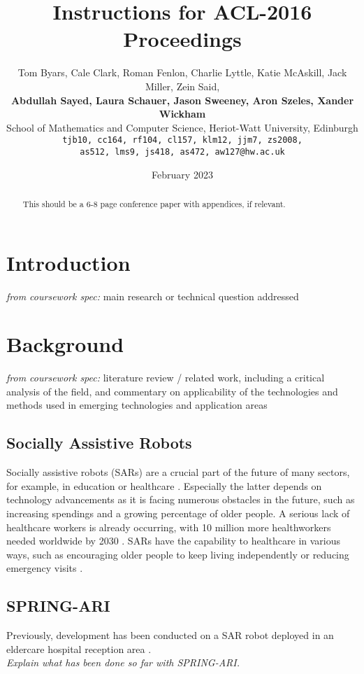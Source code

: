 \documentclass[11pt]{article}
\title{Instructions for ACL-2016 Proceedings}
\author{Tom Byars, Cale Clark, Roman Fenlon, Charlie Lyttle, Katie McAskill, Jack Miller, Zein Said, \\
{\bf Abdullah Sayed, Laura Schauer, Jason Sweeney, Aron Szeles, Xander Wickham} \\
School of Mathematics and Computer Science, Heriot-Watt University, Edinburgh \\ {\tt {tjb10, cc164, rf104, cl157, klm12, jjm7, zs2008,}} \\ {\tt {as512, lms9, js418, as472, aw127}@hw.ac.uk}}
\date{February 2023}
\begin{document}
\maketitle
\begin{abstract}
  This should be a 6-8 page conference paper with appendices, if relevant. 
\end{abstract}


\section{Introduction}
\label{sec:introduction}

\textit{from coursework spec:} main research or technical question addressed


\section{Background}
\label{sec:background}

\textit{from coursework spec:} literature review / related work, including a critical analysis of the field, and commentary on applicability of the technologies and methods used in emerging technologies and application areas

\subsection{Socially Assistive Robots} %
\label{subsec:socially_assistive_robots}
Socially assistive robots (SARs) are a crucial part of the future of many sectors, for example, in education or healthcare \cite{gunson_visually_aware_2022}. Especially the latter depends on technology advancements as it is facing numerous obstacles in the future, such as increasing spendings and a growing percentage of older people. A serious lack of healthcare workers is already occurring, with 10 million more healthworkers needed worldwide by 2030 \cite{cooper_ari_2020,Health_workforce_2023}. SARs have the capability to healthcare in various ways, such as encouraging older people to keep living independently or reducing emergency visits \cite{cooper_ari_2020}.

\subsection{SPRING-ARI}
\label{subsec:spring_ari}
Previously, development has been conducted on a SAR robot deployed in an eldercare hospital reception area \cite{addlesee_comprehensive_2020}. \\
\textit{Explain what has been done so far with SPRING-ARI.}
\end{document}
